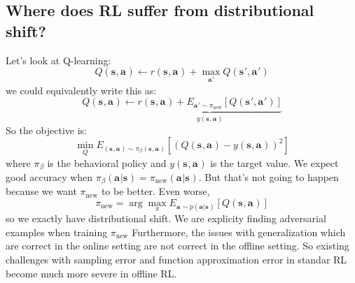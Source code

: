 \documentclass{report}
\newcommand{\argmax}{\arg\!\max}
\begin{document}
\subsection{Where does RL suffer from distributional shift?}
Let's look at Q-learning:
\begin{equation}
		Q (\bm{s}_{}, \bm{a}_{} ) \leftarrow
		r (\bm{s}_{}, \bm{a}_{} ) + \max_{\bm{a}_{}'} Q (\bm{s}_{}', \bm{a}_{}' )
\end{equation}
we could equivalently write this as:
\begin{equation}
		Q (\bm{s}_{}, \bm{a}_{} ) \leftarrow
		\underbrace{r (\bm{s}_{}, \bm{a}_{} ) + E_{\bm{a}_{}' \sim \pi_{\text{new}}} \left[    Q (\bm{s}_{}', \bm{a}_{}' )\right]}_{y (\bm{s}_{}, \bm{a}_{} )}
\end{equation}
So the objective is:
\begin{equation}
	\min_{Q} E_{(\bm{s}_{}, \bm{a}_{} )\sim \pi_{\beta}(\bm{s}_{}, \bm{a}_{} )}
	\left[ \left( Q (\bm{s}_{}, \bm{a}_{} ) - y (\bm{s}_{}, \bm{a}_{} ) \right)^{2}  \right] 
\end{equation}
where $ \pi_{\beta}  $ is the behavioral policy and
$ y (\bm{s}_{}, \bm{a}_{} ) $ is the target value.
We expect good accuracy when $ \pi_{\beta} (\bm{a}_{}|\bm{s}_{}) = \pi_{\text{new}} (\bm{a}_{}|\bm{s}_{})  $.
But that's not going to happen because we want $ \pi_{\text{new}}  $
to be better.
Even worse,
\begin{equation}
		\pi_{\text{new}} = \argmax_{\pi} E_{\bm{a}_{}\sim p(\bm{a}_{}|\bm{s}_{}) } \left[ Q (\bm{s}_{}, \bm{a}_{} ) \right] 
\end{equation}
so we exactly have distributional shift.
We are explicity finding adversarial examples when training $ \pi_{\text{new}}  $
Furthermore, the issues with generalization which are correct in the online
setting are not correct in the offline setting.
So existing challenges with sampling error and function approximation error in standar RL
become much more severe in offline RL.
\end{document}
